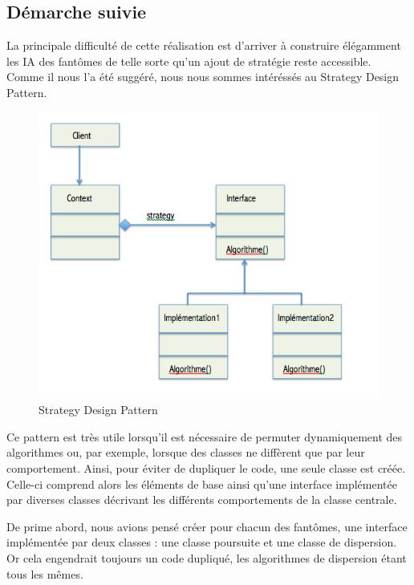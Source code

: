 \documentclass[a4paper,12pt]{report} %
\begin{document}
\subsection{Démarche suivie}
La principale difficulté de cette réalisation est d'arriver à construire élégamment les IA des fantômes de telle sorte qu'un ajout de stratégie reste accessible.
Comme il nous l'a été suggéré, nous nous sommes intéréssés au Strategy Design Pattern.

\begin{figure}[!h] %
		\centering
		\includegraphics[scale=0.7]{ressources/StrategyDesignPattern.png}
		\caption{Strategy Design Pattern}
\end{figure} 



Ce pattern est très utile lorsqu'il est nécessaire de permuter dynamiquement des algorithmes ou, par exemple, lorsque des classes ne diffèrent que par leur comportement. Ainsi, pour éviter de dupliquer le code, une seule classe est créée. Celle-ci comprend alors les éléments de base ainsi qu'une interface implémentée par diverses classes décrivant les différents comportements de la classe centrale.

De prime abord, nous avions pensé créer pour chacun des fantômes, une interface implémentée par deux classes : une classe poursuite et une classe de dispersion.
Or cela engendrait toujours un code dupliqué, les algorithmes de dispersion étant tous les mêmes.
\end{document}

